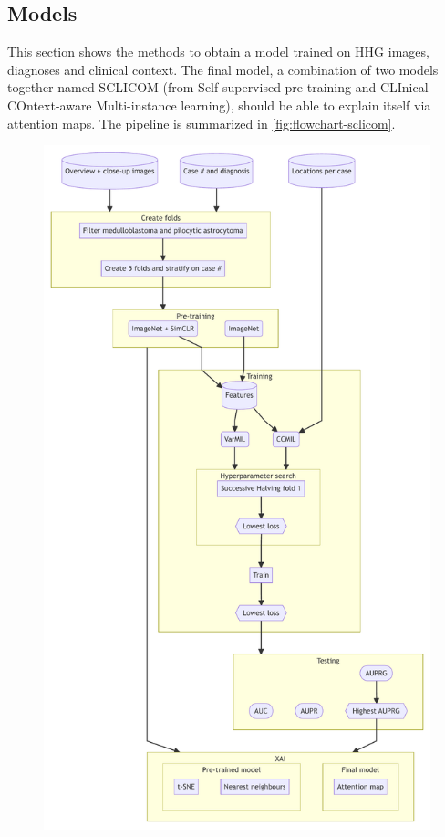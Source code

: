 \subsection{Models}\label{subsec:models}
This section shows the methods to obtain a model trained on HHG images, diagnoses and clinical context.
The final model, a combination of two models together named SCLICOM (from Self-supervised pre-training and CLInical COntext-aware Multi-instance learning), should be able to explain itself via attention maps.
The pipeline is summarized in \cref{fig:flowchart-sclicom}.

\begin{figure}
    \centering
    \includegraphics[width=\linewidth]{mermaid/brain/analytical-methods.pdf}

\end{figure}
